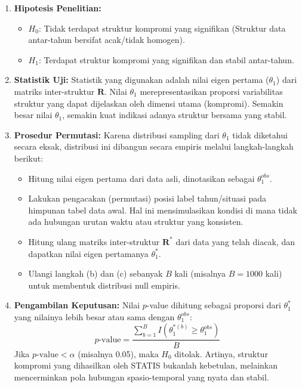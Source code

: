 \documentclass[a4paper]{article}
\theoremstyle{definition} %
\begin{document}
\begin{enumerate}
    \item \textbf{Hipotesis Penelitian:}
    \begin{itemize}
        \item $H_0$: Tidak terdapat struktur kompromi yang signifikan (Struktur data antar-tahun bersifat acak/tidak homogen).
        \item $H_1$: Terdapat struktur kompromi yang signifikan dan stabil antar-tahun.
    \end{itemize}
    
    \item \textbf{Statistik Uji:}
    Statistik yang digunakan adalah nilai eigen pertama ($\theta_1$) dari matriks inter-struktur $\mathbf{R}$. Nilai $\theta_1$ merepresentasikan proporsi variabilitas struktur yang dapat dijelaskan oleh dimensi utama (kompromi). Semakin besar nilai $\theta_1$, semakin kuat indikasi adanya struktur bersama yang stabil.
    
    \item \textbf{Prosedur Permutasi:}
    Karena distribusi sampling dari $\theta_1$ tidak diketahui secara eksak, distribusi ini dibangun secara empiris melalui langkah-langkah berikut:
    \begin{itemize}
        \item[a.] Hitung nilai eigen pertama dari data asli, dinotasikan sebagai $\theta_1^{obs}$.
        \item[b.] Lakukan pengacakan (permutasi) posisi label tahun/situasi pada himpunan tabel data awal. Hal ini mensimulasikan kondisi di mana tidak ada hubungan urutan waktu atau struktur yang konsisten.
        \item[c.] Hitung ulang matriks inter-struktur $\mathbf{R}^*$ dari data yang telah diacak, dan dapatkan nilai eigen pertamanya $\theta_1^*$.
        \item[d.] Ulangi langkah (b) dan (c) sebanyak $B$ kali (misalnya $B=1000$ kali) untuk membentuk distribusi null empiris.
    \end{itemize}
    
    \item \textbf{Pengambilan Keputusan:}
    Nilai $p$-value dihitung sebagai proporsi dari $\theta_1^*$ yang nilainya lebih besar atau sama dengan $\theta_1^{obs}$:
    \begin{equation}
        p\text{-value} = \frac{\sum_{b=1}^{B} I(\theta_1^{*(b)} \ge \theta_1^{obs})}{B}
    \end{equation}
    Jika $p\text{-value} < \alpha$ (misalnya 0.05), maka $H_0$ ditolak. Artinya, struktur kompromi yang dihasilkan oleh STATIS bukanlah kebetulan, melainkan mencerminkan pola hubungan spasio-temporal yang nyata dan stabil.
\end{enumerate}
\end{document}
